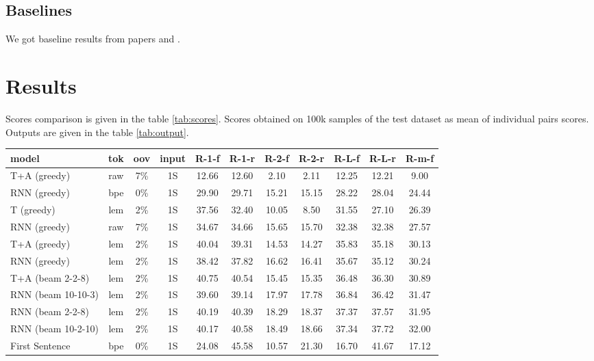 \documentclass{article}
\begin{document}
\subsection{Baselines}
We got baseline results from papers \cite{gavrilov2018self} and \cite{gusev2019importance}.

\section{Results}

Scores comparison is given in the table \ref{tab:scores}. Scores obtained on 100k samples of the test dataset as mean of individual pairs scores. Outputs are given in the table \ref{tab:output}.

\begin{table}[tbh!]
\begin{center}
\setlength{\tabcolsep}{2pt}
\begin{tabular}[t]{|l|c|c|c|ccccccc|}
\hline
model & tok & oov & input & R-1-f & R-1-r & R-2-f & R-2-r & R-L-f & R-L-r & R-m-f  \\
\hline
T+A (greedy) & raw & 7\% & 1S & 12.66 & 12.60 & 2.10 & 2.11 & 12.25 & 12.21 & 9.00\\
RNN (greedy) & bpe & 0\% & 1S & 29.90 & 29.71 & 15.21 & 15.15 & 28.22 & 28.04 & 24.44 \\
T (greedy) & lem & 2\% & 1S & 37.56 & 32.40 & 10.05 & 8.50 & 31.55 & 27.10 & 26.39 \\
RNN (greedy) & raw & 7\% & 1S & 34.67 & 34.66 & 15.65 & 15.70 & 32.38 & 32.38 & 27.57 \\
T+A (greedy) & lem & 2\% & 1S & 40.04 & 39.31 & 14.53 & 14.27 &
35.83 & 35.18 & 30.13 \\
RNN (greedy) & lem & 2\% & 1S & 38.42 & 37.82 & 16.62 & 16.41 & 35.67 & 35.12 & 30.24 \\
T+A (beam 2-2-8) & lem & 2\% & 1S & 40.75 & 40.54 & 15.45 & 15.35 &
36.48 & 36.30 & 30.89 \\
RNN (beam 10-10-3) & lem  & 2\% &  1S & 39.60 & 39.14 & 17.97 & 17.78 & 36.84 & 36.42 & 31.47 \\
RNN (beam 2-2-8) & lem  & 2\% &  1S & 40.19 & 40.39 & 18.29 & 18.37 & 37.37 & 37.57 & 31.95\\
RNN (beam 10-2-10) & lem & 2\% & 1S & 40.17 & 40.58 & 18.49 & 18.66 & 37.34 & 37.72 & 32.00 \\
\hline
First Sentence \cite{gavrilov2018self} & bpe & 0\% & 1S & 24.08 & 45.58 & 10.57 & 21.30 & 16.70 & 41.67 & 17.12 \\

\end{tabular}
\end{center}
\end{table}
\end{document}
